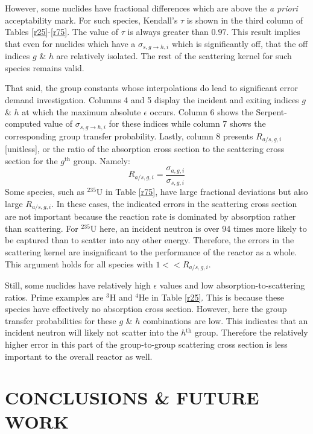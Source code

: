 \documentclass{physor2012}
\newcommand{\superscript}[1]{\ensuremath{^{\textrm{#1}}}}
\newcommand{\nuc}[2]{\superscript{#2}{#1}}
\begin{document}
However, some nuclides have fractional differences which are above the
\emph{a priori} acceptability mark.  For such species, Kendall's $\tau$ is
shown in the third column of Tables \ref{r25}-\ref{r75}.  The value of
$\tau$ is always greater than $0.97$.
This result implies that even for nuclides which have a $\sigma_{s,g\to h,i}$ which
is significantly off, that the off indices $g$ \& $h$ are relatively isolated.
The rest of the scattering kernel for such species remains valid.

That said, the group constants whose interpolations do lead to significant error
demand investigation.  Columns 4 and 5 display the incident and exiting indices
$g$ \& $h$ at which the maximum absolute $\epsilon$ occurs.  Column 6 shows
the Serpent-computed value of $\sigma_{s,g\to h,i}$ for these indices while column 7
shows the corresponding group transfer probability.  Lastly, column 8 presents
$R_{a/s,g,i}$ [unitless], or the ratio of the absorption cross section to the
scattering cross section for the $g$\superscript{th} group.  Namely:
\begin{equation}
\label{R_as}
R_{a/s,g,i} = \frac{\sigma_{a,g,i}}{\sigma_{s,g,i}}
\end{equation}
Some species, such as \nuc{U}{235} in Table \ref{r75}, have large fractional deviations
but also large $R_{a/s,g,i}$.  In these cases, the indicated errors in the
scattering cross section are not important because the reaction rate is dominated
by absorption rather than scattering.  For \nuc{U}{235} here, an incident neutron is
over 94 times more likely to be captured than to scatter into any other energy.
Therefore, the errors in the scattering kernel are insignificant to the performance
of the reactor as a whole.  This argument holds for all species with $1 << R_{a/s,g,i}$.

Still, some nuclides have relatively high $\epsilon$ values and
low absorption-to-scattering ratios.  Prime examples are \nuc{H}{3} and \nuc{He}{4}
in Table \ref{r25}.  This is because these species have effectively no
absorption cross section.  However, here the group transfer probabilities
for these $g$ \& $h$ combinations are low.  This indicates that an incident
neutron will likely not scatter into the $h$\superscript{th} group.  Therefore the
relatively higher error in this part of the group-to-group scattering cross section
is less important to the overall reactor as well.

\section{CONCLUSIONS \& FUTURE WORK}
\label{sec:conclusions}
\end{document}
